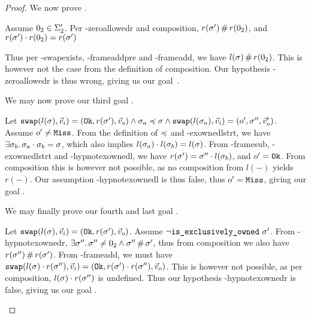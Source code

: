 \begin{proof}

We now prove .

\begin{hypvlist}
	 Assume $0_2\in \Sigma_2'$.
	 Per \hyp{zeroallowedr} and composition, $r(\sigma')\operatorname{\#} r(0_2)$, and $r(\sigma')\cdot r(0_2)= r(\sigma')$
\end{hypvlist}

Thus per \hyp{swapexists}, \hyp{frameaddpre} and \hyp{frameadd}, we have $l(\sigma)\operatorname{\#} r(0_2)$. This is however not the case from the definition of composition. Our hypothesis \hyp{zeroallowedr} is thus wrong, giving us our goal~.


We may now prove our third goal .

\begin{hypvlist}
	 Let $\texttt{swap}(l(\sigma),\vec{v}_i)=(\texttt{Ok},r(\sigma'),\vec{v}_o) \land \sigma_a\preccurlyeq\sigma \land \texttt{swap}(l(\sigma_a),\vec{v}_i)=(o',\sigma'',\vec{v}_o')$.%
	 Assume $o'\neq\texttt{Miss}$.
	 From the definition of $\preccurlyeq$ and \hyp{exownedlstrt}, we have $\exists \sigma_b\ldotp \sigma_a\cdot\sigma_b=\sigma$, which also implies $l(\sigma_a)\cdot l(\sigma_b) = l(\sigma)$.
	 From \hyp{framesub}, \hyp{exownedlstrt} and \hyp{hypnotexownedl}, we have $r(\sigma')=\sigma''\cdot l(\sigma_b)$, and $o'=\texttt{Ok}$. From composition this is however not possible, as no composition from $l(-)$ yields $r(-)$. Our assumption \hyp{hypnotexownedl} is thus false, thus $o'=\texttt{Miss}$, giving our goal .
\end{hypvlist}



We may finally prove our fourth and last goal .

\begin{hypvlist}
	 Let $\texttt{swap}(l(\sigma),\vec{v}_i)=(\texttt{Ok},r(\sigma'),\vec{v}_o)$.
	 Assume $\neg\texttt{is\_exclusively\_owned}~\sigma'$.
	 From \hyp{hypnotexownedr}, $\exists \sigma''\ldotp \sigma''\neq0_2 \land \sigma''\operatorname{\#}\sigma'$, thus from composition we also have $r(\sigma'')\operatorname{\#} r(\sigma')$.%
	 From \hyp{frameadd}, we must have $\texttt{swap}(l(\sigma)\cdot r(\sigma''),\vec{v}_i)=(\texttt{Ok},r(\sigma')\cdot r(\sigma''),\vec{v}_o)$. This is however not possible, as per composition, $l(\sigma)\cdot r(\sigma'')$ is undefined. Thus our hypothesis \hyp{hypnotexownedr} is false, giving us our goal .
	
\end{hypvlist}

\end{proof}
